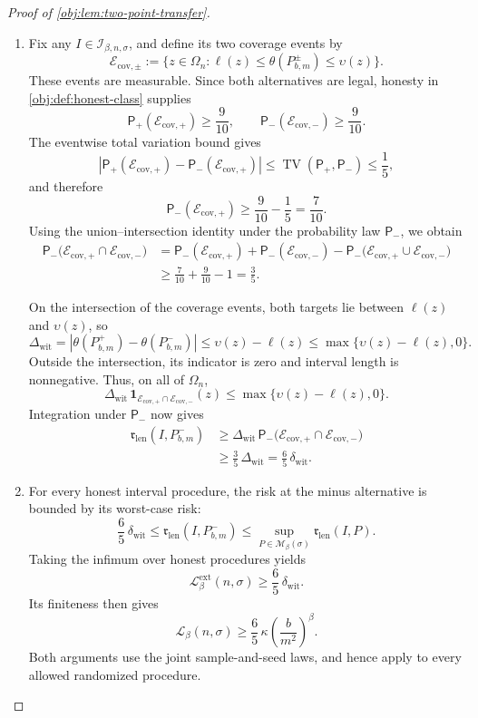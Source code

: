 \begin{proof}[Proof of \cref{obj:lem:two-point-transfer}]
\begin{enumerate}
\item
Fix any \(I\in\mathcal I_{\beta,n,\sigma}\), and define its two coverage events by
\[
\mathcal E_{\mathrm{cov},\pm}
:=
\{z\in\Omega_n:
\ell(z)\le\theta(P^\pm_{b,m})\le\upsilon(z)\}.
\]
These events are measurable. Since both alternatives are legal, honesty in \cref{obj:def:honest-class} supplies
\[
\mathsf P_+(\mathcal E_{\mathrm{cov},+})\ge\frac9{10},
\qquad
\mathsf P_-(\mathcal E_{\mathrm{cov},-})\ge\frac9{10}.
\]
The eventwise total variation bound gives
\[
\left|
\mathsf P_+(\mathcal E_{\mathrm{cov},+})
-
\mathsf P_-(\mathcal E_{\mathrm{cov},+})
\right|
\le
\operatorname{TV}(\mathsf P_+,\mathsf P_-)
\le\frac15,
\]
and therefore
\[
\mathsf P_-(\mathcal E_{\mathrm{cov},+})
\ge\frac9{10}-\frac15=\frac7{10}.
\]
Using the union--intersection identity under the probability law \(\mathsf P_-\), we obtain
\[
\begin{aligned}
\mathsf P_-\bigl(
\mathcal E_{\mathrm{cov},+}\cap\mathcal E_{\mathrm{cov},-}
\bigr)
&=
\mathsf P_-(\mathcal E_{\mathrm{cov},+})
+
\mathsf P_-(\mathcal E_{\mathrm{cov},-})
-
\mathsf P_-\bigl(
\mathcal E_{\mathrm{cov},+}\cup\mathcal E_{\mathrm{cov},-}
\bigr)
\\
&\ge
\frac7{10}+\frac9{10}-1
=
\frac35.
\end{aligned}
\]

On the intersection of the coverage events, both targets lie between \(\ell(z)\) and \(\upsilon(z)\), so
\[
\Delta_{\mathrm{wit}}
=
|\theta(P^+_{b,m})-\theta(P^-_{b,m})|
\le
\upsilon(z)-\ell(z)
\le
\max\{\upsilon(z)-\ell(z),0\}.
\]
Outside the intersection, its indicator is zero and interval length is nonnegative. Thus, on all of \(\Omega_n\),
\[
\Delta_{\mathrm{wit}}\,
\mathbf1_{\mathcal E_{\mathrm{cov},+}\cap\mathcal E_{\mathrm{cov},-}}(z)
\le
\max\{\upsilon(z)-\ell(z),0\}.
\]
Integration under \(\mathsf P_-\) now gives
\[
\begin{aligned}
\mathfrak r_{\mathrm{len}}(I,P^-_{b,m})
&\ge
\Delta_{\mathrm{wit}}\,
\mathsf P_-\bigl(
\mathcal E_{\mathrm{cov},+}\cap\mathcal E_{\mathrm{cov},-}
\bigr)
\\
&\ge
\frac35\,\Delta_{\mathrm{wit}}
=
\frac65\,\delta_{\mathrm{wit}}.
\end{aligned}
\]

\item
For every honest interval procedure, the risk at the minus alternative is bounded by its worst-case risk:
\[
\frac65\,\delta_{\mathrm{wit}}
\le
\mathfrak r_{\mathrm{len}}(I,P^-_{b,m})
\le
\sup_{P\in\mathcal M_\beta(\sigma)}
\mathfrak r_{\mathrm{len}}(I,P).
\]
Taking the infimum over honest procedures yields
\[
\mathcal L^{\mathrm{ext}}_\beta(n,\sigma)
\ge
\frac65\,\delta_{\mathrm{wit}}.
\]
Its finiteness then gives
\[
\mathcal L_\beta(n,\sigma)
\ge
\frac65\,\kappa\left(\frac{b}{m^2}\right)^\beta.
\]
Both arguments use the joint sample-and-seed laws, and hence apply to every allowed randomized procedure.
\end{enumerate}
\end{proof}
